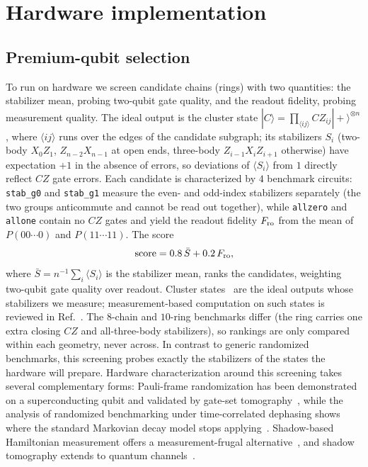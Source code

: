 \section{Hardware implementation}
\label{sec:hardware}

\subsection{Premium-qubit selection}
\label{sec:premium}

To run on hardware we screen candidate chains (rings) with two
quantities: the stabilizer mean, probing two-qubit gate quality, and
the readout fidelity, probing measurement quality.
The ideal output is the cluster state
$|C\rangle=\prod_{\langle ij\rangle}CZ_{ij}|+\rangle^{\otimes n}$,
where $\langle ij\rangle$ runs over the edges of the candidate subgraph;
its stabilizers $S_i$ (two-body $X_0Z_1$, $Z_{n-2}X_{n-1}$ at open ends,
three-body $Z_{i-1}X_iZ_{i+1}$ otherwise) have expectation $+1$ in the
absence of errors, so deviations of $\langle S_i\rangle$ from $1$
directly reflect $CZ$ gate errors.
Each candidate is characterized by $4$ benchmark circuits: \texttt{stab\_g0}
and \texttt{stab\_g1} measure the even- and odd-index stabilizers separately
(the two groups anticommute and cannot be read out together), while
\texttt{allzero} and \texttt{allone} contain no $CZ$ gates and yield the readout
fidelity $F_{\rm ro}$ from the mean of $P(00\cdots0)$ and
$P(11\cdots11)$. The score
\begin{equation}
{\rm score}=0.8\,\bar{S}+0.2\,F_{\rm ro},
\end{equation}
where $\bar{S}=n^{-1}\sum_i\langle S_i\rangle$ is the stabilizer mean,
ranks the candidates, weighting two-qubit gate quality over readout.
Cluster states~\cite{raussendorf2001oneway}
are the ideal outputs whose stabilizers we measure; measurement-based
computation on such states is reviewed in
Ref.~\cite{briegel2009measurement}.
The $8$-chain and $10$-ring benchmarks differ (the ring carries one
extra closing $CZ$ and all-three-body stabilizers), so rankings are only
compared within each geometry, never across. In contrast to generic
randomized benchmarks, this screening probes exactly the stabilizers of
the states the hardware will prepare.
Hardware characterization around this screening takes several
complementary forms: Pauli-frame randomization has been demonstrated on
a superconducting qubit and validated by gate-set
tomography~\cite{ware2021experimental}, while the analysis of
randomized benchmarking under time-correlated dephasing shows where the
standard Markovian decay model stops
applying~\cite{qi2021randomized}. Shadow-based Hamiltonian measurement
offers a measurement-frugal
alternative~\cite{hadfield2022measurements,huang2021derandomization}, and
shadow tomography extends to quantum
channels~\cite{kunjummen2023shadow}.

